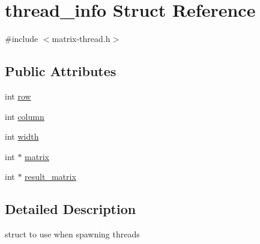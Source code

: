 \hypertarget{structthread__info}{\section{thread\-\_\-info Struct Reference}
\label{structthread__info}
}


{\ttfamily \#include $<$matrix-\/thread.\-h$>$}

\subsection*{Public Attributes}
\begin{DoxyCompactItemize}
\item 
int \hyperlink{structthread__info_a0fb23597b4babe618d9fc5a44f15a110}{row}
\item 
int \hyperlink{structthread__info_a23730021e335c8434442f6c08c39d5d3}{column}
\item 
int \hyperlink{structthread__info_af708cf019e6b4d58a30b4519d8c31e65}{width}
\item 
int $\ast$ \hyperlink{structthread__info_a86d6bf42442a6d69385654fe4f6ede4e}{matrix}
\item 
int $\ast$ \hyperlink{structthread__info_a65c42fcdb0d5c06839e4bec9582cc4a0}{result\-\_\-matrix}
\end{DoxyCompactItemize}


\subsection{Detailed Description}
struct to use when spawning threads 

